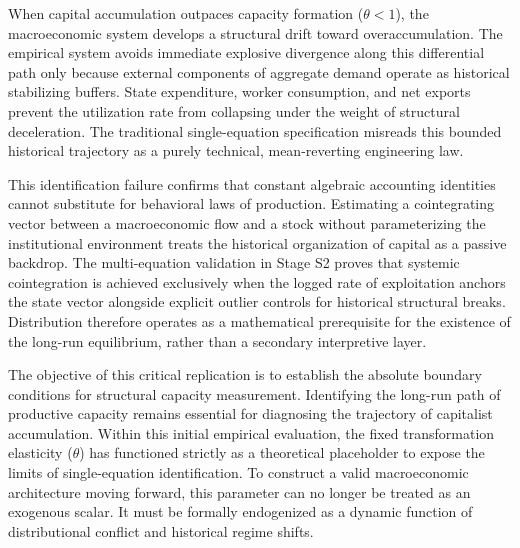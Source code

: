\documentclass[11pt]{article}
\begin{document}
When capital accumulation outpaces capacity formation ($\theta < 1$), the macroeconomic system develops a structural drift toward overaccumulation. The empirical system avoids immediate explosive divergence along this differential path only because external components of aggregate demand operate as historical stabilizing buffers. State expenditure, worker consumption, and net exports prevent the utilization rate from collapsing under the weight of structural deceleration. The traditional single-equation specification misreads this bounded historical trajectory as a purely technical, mean-reverting engineering law.

This identification failure confirms that constant algebraic accounting identities cannot substitute for behavioral laws of production. Estimating a cointegrating vector between a macroeconomic flow and a stock without parameterizing the institutional environment treats the historical organization of capital as a passive backdrop. The multi-equation validation in Stage S2 proves that systemic cointegration is achieved exclusively when the logged rate of exploitation anchors the state vector alongside explicit outlier controls for historical structural breaks. Distribution therefore operates as a mathematical prerequisite for the existence of the long-run equilibrium, rather than a secondary interpretive layer.

The objective of this critical replication is to establish the absolute boundary conditions for structural capacity measurement. Identifying the long-run path of productive capacity remains essential for diagnosing the trajectory of capitalist accumulation. Within this initial empirical evaluation, the fixed transformation elasticity ($\theta$) has functioned strictly as a theoretical placeholder to expose the limits of single-equation identification. To construct a valid macroeconomic architecture moving forward, this parameter can no longer be treated as an exogenous scalar. It must be formally endogenized as a dynamic function of distributional conflict and historical regime shifts.

\pagebreak


\pagebreak
\appendix

\pagebreak

\end{document}
